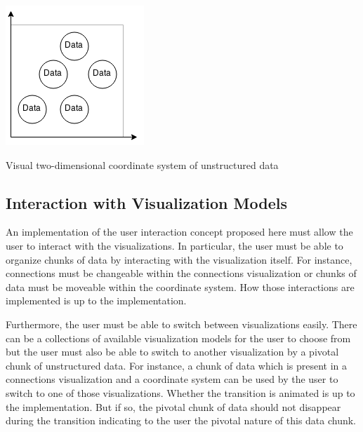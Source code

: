 \begin{flfigure}
  \centering
    \includegraphics[width=0.5\linewidth]{00_resources/data_coord_system.png}
    \caption{Visual two-dimensional coordinate system of unstructured data}
  \label{fig:visualcoordsys}
\end{flfigure}

\subsection{Interaction with Visualization Models}

An implementation of the user interaction concept proposed here must allow the
user to interact with the visualizations. In particular, the user must be able
to organize chunks of data by interacting with the visualization itself. For
instance, connections must be changeable within the connections visualization or
chunks of data must be moveable within the coordinate system. How those
interactions are implemented is up to the implementation.

Furthermore, the user must be able to switch between visualizations easily.
There can be a collections of available visualization models for the user to
choose from but the user must also be able to switch to another visualization
by a pivotal chunk of unstructured data. For instance, a chunk of data which is
present in a connections visualization and a coordinate system can be used by
the user to switch to one of those visualizations. Whether the transition is
animated is up to the implementation. But if so, the pivotal chunk of data
should not disappear during the transition indicating to the user the pivotal
nature of this data chunk.
